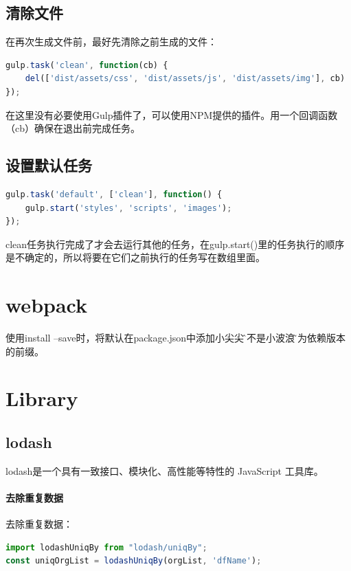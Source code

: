 \documentclass[letter]{book}
\begin{document}
\subsection{清除文件}

在再次生成文件前，最好先清除之前生成的文件：

\begin{lstlisting}[language=JavaScript]
gulp.task('clean', function(cb) {
	del(['dist/assets/css', 'dist/assets/js', 'dist/assets/img'], cb)
});
\end{lstlisting}

在这里没有必要使用Gulp插件了，可以使用NPM提供的插件。用一个回调函数（cb）确保在退出前完成任务。

\subsection{设置默认任务}

\begin{lstlisting}[language=JavaScript]
gulp.task('default', ['clean'], function() {
	gulp.start('styles', 'scripts', 'images');
});
\end{lstlisting}

clean任务执行完成了才会去运行其他的任务，在gulp.start()里的任务执行的顺序是不确定的，所以将要在它们之前执行的任务写在数组里面。

\section{webpack}

使用install --save时，将默认在package.json中添加小尖尖\^而不是小波浪\~作为依赖版本的前缀。

\section{Library}

\subsection{lodash}

lodash是一个具有一致接口、模块化、高性能等特性的 JavaScript 工具库。

\paragraph{去除重复数据}

去除重复数据：

\begin{lstlisting}[language=JavaScript]
import lodashUniqBy from "lodash/uniqBy";
const uniqOrgList = lodashUniqBy(orgList, 'dfName');
\end{lstlisting}
\end{document}

